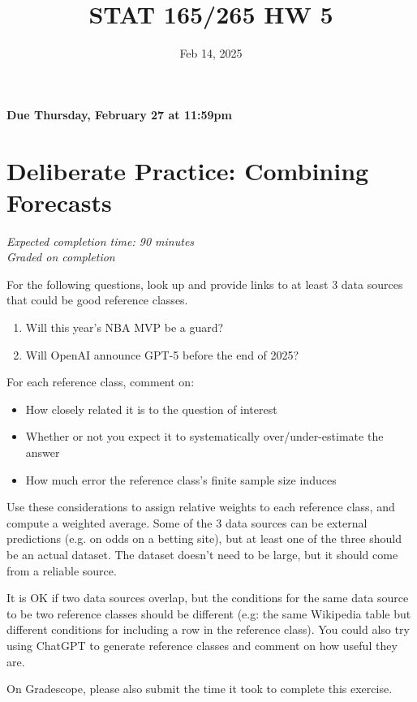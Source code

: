 \documentclass[11pt]{article}
\title{STAT 165/265 HW 5}
\date{Feb 14, 2025}
\begin{document}
\maketitle

\hfill \textbf{Due Thursday, February 27 at 11:59pm}

\section*{Deliberate Practice: Combining Forecasts}

\emph{Expected completion time: 90 minutes} \\
\emph{Graded on completion}


For the following questions, look up and provide links to at least 3 data sources that could be good reference classes. 

\begin{enumerate}
    \item Will this year's NBA MVP be a guard?
    \item Will OpenAI announce GPT-5 before the end of 2025?
\end{enumerate}

For each reference class, comment on: 
\begin{itemize}
	\item How closely related it is to the question of interest
	\item Whether or not you expect it to systematically over/under-estimate the answer
	\item How much error the reference class's finite sample size induces
\end{itemize}

Use these considerations to assign relative weights to each reference class, and compute a weighted average. Some of the 3 data sources can be external predictions (e.g. on odds on a betting site), but at least one of the three should be an actual dataset. The dataset doesn't need to be large, but it should come from a reliable source. 

It is OK if two data sources overlap, but the conditions for the same data source to be two reference classes should be different (e.g: the same Wikipedia table but different conditions for including a row in the reference class). You could also try using ChatGPT to generate reference classes and comment on how useful they are. 

On Gradescope, please also submit the time it took to complete this exercise.
\end{document}
